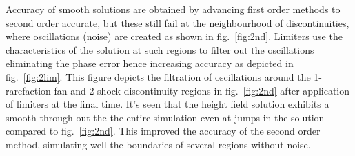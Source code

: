 \documentclass[11pt,a4paper]{article}
\begin{document}
	Accuracy of smooth solutions are obtained by advancing first order methods to second order accurate, but these still fail at the neighbourhood of discontinuities, where oscillations (noise) are created as shown in fig.~\ref{fig:2nd}. Limiters use the characteristics of the solution at such regions to filter out the oscillations eliminating the phase error hence increasing accuracy as depicted in fig.~\ref{fig:2lim}.
	This figure depicts the filtration of oscillations around the 1-rarefaction fan and 2-shock discontinuity regions in fig.~\ref{fig:2nd} after application of limiters at the final time. It's seen that the height field solution exhibits a smooth through out the the entire simulation even at jumps in the solution compared to  fig.~\ref{fig:2nd}. This improved the accuracy of the second order method, simulating well the boundaries of several regions without noise.
\end{document}
